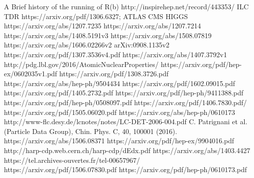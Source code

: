 \documentclass[a4paper]{article}
\begin{document}
% 
\begin{thebibliography}{100} 
 A Brief history of the running of R(b) http://inspirehep.net/record/443353/
 ILC TDR https://arxiv.org/pdf/1306.6327;
 ATLAS CMS HIGGS 
https://arxiv.org/abs/1207.7235
 https://arxiv.org/abs/1207.7214
  https://arxiv.org/abs/1408.5191v3
 https://arxiv.org/abs/1508.07819
 https://arxiv.org/abs/1606.02266v2
  arXiv:0908.1135v2
 https://arxiv.org/pdf/1307.3536v4.pdf
 https://arxiv.org/abs/1407.3792v1
 http://pdg.lbl.gov/2016/AtomicNuclearProperties/
 https://arxiv.org/pdf/hep-ex/0602035v1.pdf
https://arxiv.org/pdf/1308.3726.pdf
 https://arxiv.org/abs/hep-ph/9504434
 https://arxiv.org/pdf/1602.09015.pdf
 https://arxiv.org/pdf/1405.2732.pdf
 https://arxiv.org/pdf/hep-ph/9411388.pdf
https://arxiv.org/pdf/hep-ph/0508097.pdf
 https://arxiv.org/pdf/1406.7830.pdf/
https://arxiv.org/pdf/1505.06020.pdf
https://arxiv.org/abs/hep-ph/0610173
http://www-flc.desy.de/lcnotes/notes/LC-DET-2006-004.pdf
C. Patrignani et al. (Particle Data Group), Chin. Phys. C, 40, 100001 (2016).
 https://arxiv.org/abs/1506.08371
 https://arxiv.org/pdf/hep-ex/9904016.pdf
 http://harp-cdp.web.cern.ch/harp-cdp/dEdx.pdf
 https://arxiv.org/abs/1403.4427
 https://tel.archives-ouvertes.fr/tel-00657967/
https://arxiv.org/pdf/1506.07830.pdf
https://arxiv.org/pdf/hep-ph/0610173.pdf
\end{thebibliography}
\end{document}
